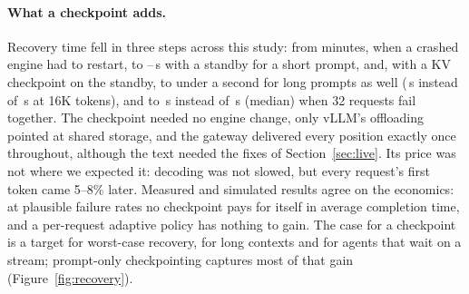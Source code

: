 \documentclass[10pt,twocolumn]{article}
\begin{document}
\paragraph{What a checkpoint adds.} Recovery time fell in three steps across
this study: from minutes, when a crashed engine had to restart, to
\GwFailoverMin--\GwFailoverMax\,s with a standby for a short prompt, and, with
a KV checkpoint on the standby, to under a second for long prompts as well
(\PfbSixteenPrompt\,s instead of \PfbSixteenNone\,s at 16K tokens), and to
\PccThirtyTwoPrompt\,s instead of \PccThirtyTwoNone\,s (median) when 32
requests fail together. The checkpoint needed no engine change, only vLLM's
offloading pointed at shared storage, and the gateway delivered every
position exactly once throughout, although the text needed the fixes of
Section~\ref{sec:live}. Its price was not where we expected it: decoding was
not slowed, but every request's first token came 5--8\% later. Measured and simulated
results agree on the economics: at plausible failure rates no checkpoint pays
for itself in average completion time, and a per-request adaptive policy has
nothing to gain. The case for a checkpoint is a target for worst-case
recovery, for long contexts and for agents that wait on a stream; prompt-only
checkpointing captures most of that gain (Figure~\ref{fig:recovery}).
\end{document}
